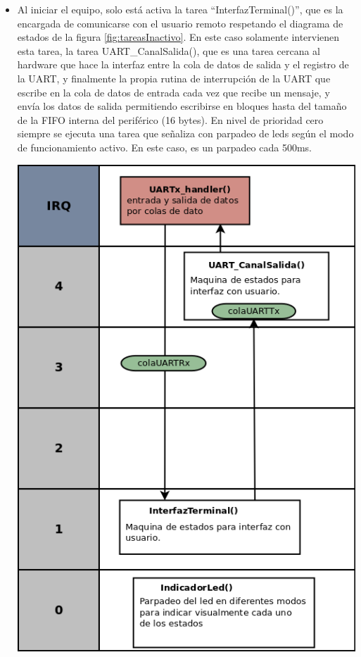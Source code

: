 \begin{itemize}

	\item Al iniciar el equipo, solo está activa la tarea “InterfazTerminal()”, que es la encargada de comunicarse con el usuario remoto respetando el diagrama de estados de la figura \ref{fig:tareasInactivo}. En este caso solamente intervienen esta tarea, la tarea UART\_CanalSalida(), que es una tarea cercana al hardware que hace la interfaz entre la cola de datos de salida y el registro de la UART, y finalmente la propia rutina de interrupción de la UART que escribe en la cola de datos de entrada cada vez que recibe un mensaje, y envía los datos de salida permitiendo escribirse en bloques hasta del tamaño de la FIFO interna del periférico (16 bytes). En nivel de prioridad cero siempre se ejecuta una tarea que señaliza con parpadeo de leds según el modo de funcionamiento activo. En este caso, es un parpadeo cada 500ms.

\begin{adjustbox}{center,caption={Diagrama de tareas en modo inactivo},label={fig:tareasInactivo},nofloat=figure,vspace=\bigskipamount}
\includegraphics[scale = 0.33]{./Figures/VOP24_tareas_v1_modoInactivoConf.png}
\end{adjustbox}


\end{itemize}
